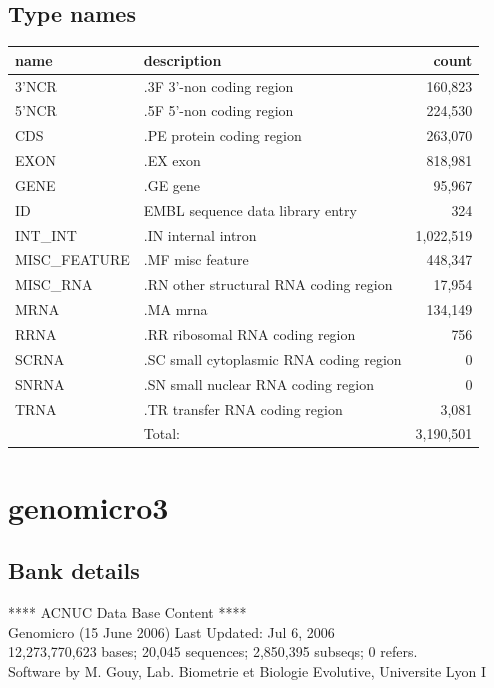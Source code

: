 \documentclass{article}
\begin{document}
\begin{Schunk}
\subsection{Type names}
\noindent\begin{tabular}{llr}
\hline \hline
name & description & count \\
\hline
3'NCR  &  .3F  3'-non coding region  &  160,823 \\
5'NCR  &  .5F  5'-non coding region  &  224,530 \\
CDS  &  .PE protein coding region  &  263,070 \\
EXON  &  .EX exon  &  818,981 \\
GENE  &  .GE gene  &  95,967 \\
ID  &  EMBL sequence data library entry  &  324 \\
INT\_INT  &  .IN  internal intron  &  1,022,519 \\
MISC\_FEATURE  &  .MF misc feature  &  448,347 \\
MISC\_RNA  &  .RN other structural RNA coding region  &  17,954 \\
MRNA  &  .MA mrna  &  134,149 \\
RRNA  &  .RR ribosomal RNA coding region  &  756 \\
SCRNA  &  .SC small cytoplasmic RNA coding region  &  0 \\
SNRNA  &  .SN small nuclear RNA coding region  &  0 \\
TRNA  &  .TR transfer RNA coding region  &  3,081 \\
\hline
 & Total: & 3,190,501 \\
\hline \hline
\end{tabular}

\section{ genomicro3 }
\subsection{Bank details}
             ****     ACNUC Data Base Content      ****                         \\
              Genomicro (15 June 2006) Last Updated: Jul  6, 2006\\
12,273,770,623 bases; 20,045 sequences; 2,850,395 subseqs; 0 refers.\\
Software by M. Gouy, Lab. Biometrie et Biologie Evolutive, Universite Lyon I 


\end{Schunk}
\end{document}
